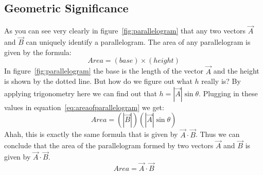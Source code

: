         \subsection{Geometric Significance}
            
            As you can see very clearly in figure~\ref{fig:parallelogram} that any two vectors $\vec{A}$ and $\vec{B}$ can uniquely identify a parallelogram. The area of any parallelogram is given by the formula:
            \begin{equation}\label{eq:areaofparallelogram}
            Area = (base)\times(height)
            \end{equation}
            In figure~\ref{fig:parallelogram} the base is the length of the vector $\vec{A}$ and the height is shown by the dotted line. But how do we figure out what $h$ really is? By applying trigonometry here we can find out that $h = |\vec{A}|\sin\theta$. Plugging in these values in equation~\ref{eq:areaofparallelogram} we get:
            $$Area = (|\vec{B}|)(|\vec{A}|\sin\theta)$$
            Ahah, this is exactly the same formula that is given by $\vec{A}\cdot\vec{B}$. Thus we can conclude that the area of the parallelogram formed by two vectors $\vec{A}$ and $\vec{B}$ is given by $\vec{A}\cdot\vec{B}$.
            $$Area = \vec{A}\cdot\vec{B}$$
        
